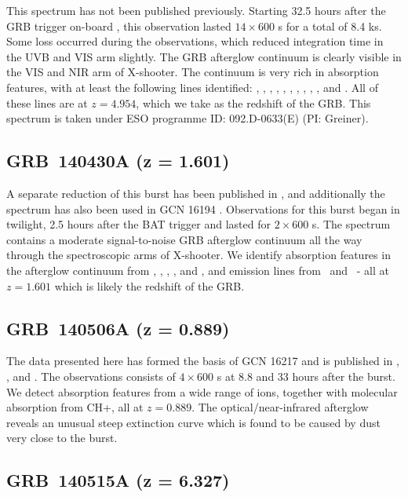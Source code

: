\documentclass[longauth]{aa}    %
\begin{document}
This spectrum has not been published previously. Starting 32.5 hours after the
GRB trigger on-board \swift, this observation lasted $14\times600$ s for a total
of 8.4 ks. Some loss occurred during the observations, which reduced integration
time in the UVB and VIS arm slightly. The GRB afterglow continuum is clearly
visible in the VIS and NIR arm of X-shooter. The continuum is very rich in
absorption features, with at least the following lines identified: \lyg, \lyb,
\lya, \SIii, \SIiv, \civ, \alii, \aliii, \feii, \mgii, and \mgi. All of these
lines are at $z = 4.954$, which we take as the redshift of the GRB. This spectrum
is taken under ESO programme ID: 092.D-0633(E) (PI: Greiner).

\subsection{GRB~140430A (z = 1.601)}\label{140430}

A separate reduction of this burst has been published in \citet{Kruhler2015},
and additionally the spectrum has also been used in GCN 16194 \citep{GCN16194}.
Observations for this burst began in twilight, 2.5 hours after the BAT trigger
and lasted for $2\times600$ s. The spectrum contains a moderate signal-to-noise
GRB afterglow continuum all the way through the spectroscopic arms of X-shooter.
We identify absorption features in the afterglow continuum from \SIii, \civ,
\alii, \feii, and \mgii, and emission lines from \oii~and \oiii~- all at $z =
1.601$ which is likely the redshift of the GRB.

\subsection{GRB~140506A  (z = 0.889)} \label{140506}

The data presented here has formed the basis of GCN 16217 \citep{GCN16217} and
is published in \citet{Fynbo2014}, \citet{Kruhler2015}, and \citet{Heintz2017a}.
The observations consists of $4\times 600$ s at 8.8 and 33 hours after the
burst. We detect absorption features from a wide range of ions, together with
molecular absorption from CH+, all at $z=0.889$. The optical/near-infrared
afterglow reveals an unusual steep extinction curve which is found to be caused
by dust very close to the burst.

\subsection{GRB~140515A (z = 6.327)}\label{140515}
\end{document}

